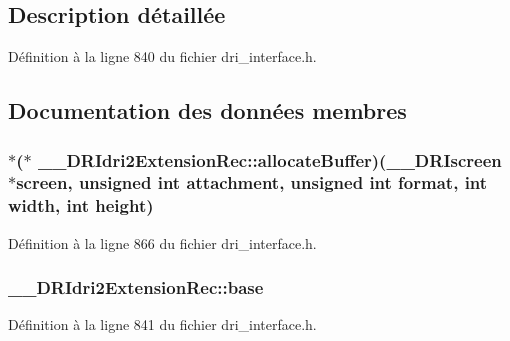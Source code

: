 \subsection{Description détaillée}


Définition à la ligne 840 du fichier dri\-\_\-interface.\-h.



\subsection{Documentation des données membres}
\hypertarget{struct_____d_r_idri2_extension_rec_ac6bb7197eae12575037f5797b0012cd9}{
\subsubsection[{allocate\-Buffer}]{$\ast$($\ast$ \-\_\-\-\_\-\-D\-R\-Idri2\-Extension\-Rec\-::allocate\-Buffer)({\bf \-\_\-\-\_\-\-D\-R\-Iscreen} $\ast$screen, unsigned int {\bf attachment}, unsigned int {\bf format}, int {\bf width}, int {\bf height})}}\label{struct_____d_r_idri2_extension_rec_ac6bb7197eae12575037f5797b0012cd9}


Définition à la ligne 866 du fichier dri\-\_\-interface.\-h.

\hypertarget{struct_____d_r_idri2_extension_rec_a71675244c4518f1cd35041acd4836135}{
\subsubsection[{base}]{ \-\_\-\-\_\-\-D\-R\-Idri2\-Extension\-Rec\-::base}}\label{struct_____d_r_idri2_extension_rec_a71675244c4518f1cd35041acd4836135}


Définition à la ligne 841 du fichier dri\-\_\-interface.\-h.

